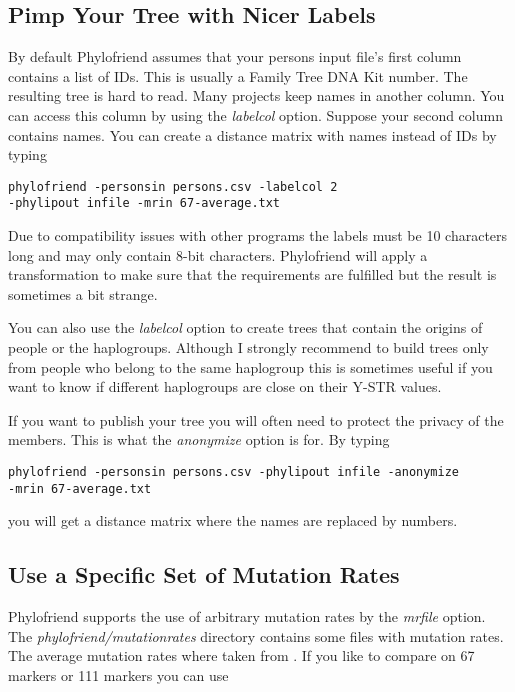 \subsection{Pimp Your Tree with Nicer Labels}

By default Phylofriend assumes that your persons input file's
first column contains a list of IDs. This is usually a Family
Tree DNA Kit number. The resulting tree is hard to read. Many
projects keep names in another column. You can access this 
column by using the \emph{labelcol} option. Suppose your second
column contains names. You can create a distance matrix with
names instead of IDs by typing

\noindent\texttt{phylofriend -personsin persons.csv -labelcol 2\\
-phylipout infile -mrin 67-average.txt}

Due to compatibility issues with other programs the labels
must be 10 characters long and may only contain 8-bit
characters. Phylofriend will apply a transformation to
make sure that the requirements are fulfilled 
but the result is sometimes a bit strange.

You can also use the \emph{labelcol} option to create trees
that contain the origins of people or the haplogroups. Although
I strongly recommend to build trees only from people who
belong to the same haplogroup this is sometimes useful if
you want to know if different haplogroups are close on their
Y-STR values.

If you want to publish your tree you will often need to
protect the privacy of the members. This is what the
\emph{anonymize} option is for. By typing

\noindent\texttt{phylofriend -personsin persons.csv -phylipout infile -anonymize\\
-mrin 67-average.txt}

you will get a distance matrix where the names are replaced
by numbers.


\subsection{Use a Specific Set of Mutation Rates}

Phylofriend supports the use of arbitrary mutation rates by
the \emph{mrfile} option. The \emph{phylofriend/mutationrates}
directory contains some files with mutation rates. The average
mutation rates where taken from \cite{Kly12}.
If you like to compare on 67 markers or 111 markers you can use

